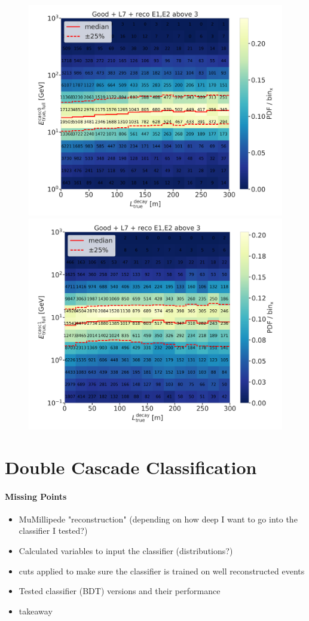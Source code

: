 \begin{figure}[h]
    \centering
    \includegraphics[width=0.49\linewidth]{figures/results/190607/true_decayL_vs_casc0_true_energy_reco_above3_step_contours.png}
    \includegraphics[width=0.49\linewidth]{figures/results/190607/true_decayL_vs_casc1_true_energy_reco_above3_step_contours.png}
\end{figure}


\section{Double Cascade Classification}

\paragraph{Missing Points}
\begin{itemize}
    \item MuMillipede "reconstruction" (depending on how deep I want to go into the classifier I tested?)
    \item Calculated variables to input the classifier (distributions?)
    \item cuts applied to make sure the classifier is trained on well reconstructed events
    \item Tested classifier (BDT) versions and their performance
    \item takeaway
\end{itemize}

